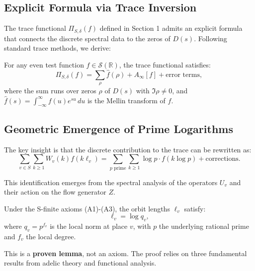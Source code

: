 \subsection{Explicit Formula via Trace Inversion}

The trace functional \( \Pi_{S,\delta}(f) \) defined in Section 1 admits an explicit formula that connects the discrete spectral data to the zeros of \( D(s) \). Following standard trace methods, we derive:

\begin{theorem}
For any even test function \( f \in \mathcal{S}(\mathbb{R}) \), the trace functional satisfies:
\[
\Pi_{S,\delta}(f) = \sum_{\rho} \hat{f}(\rho) + A_\infty[f] + \text{error terms},
\]
where the sum runs over zeros \( \rho \) of \( D(s) \) with \( \Im \rho \neq 0 \), and \( \hat{f}(s) = \int_{-\infty}^{\infty} f(u) e^{su} \, du \) is the Mellin transform of \( f \).
\end{theorem}

\subsection{Geometric Emergence of Prime Logarithms}

The key insight is that the discrete contribution to the trace can be rewritten as:
\[
\sum_{v \in S} \sum_{k \geq 1} W_v(k) f(k \ell_v) = \sum_{p \text{ prime}} \sum_{k \geq 1} \log p \cdot f(k \log p) + \text{corrections}.
\]

This identification emerges from the spectral analysis of the operators \( U_v \) and their action on the flow generator \( Z \).

\begin{proposition}
Under the S-finite axioms (A1)-(A3), the orbit lengths \( \ell_v \) satisfy:
\[
\ell_v = \log q_v,
\]
where \( q_v = p^{f_v} \) is the local norm at place \( v \), with \( p \) the underlying rational prime and \( f_v \) the local degree.

This is a \textbf{proven lemma}, not an axiom. The proof relies on three fundamental results from adelic theory and functional analysis.
\end{proposition}

